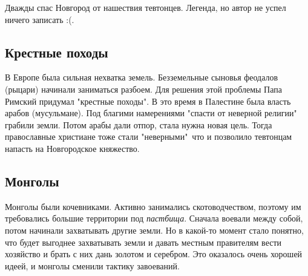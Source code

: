Дважды спас Новгород от нашествия тевтонцев. Легенда, но автор не успел ничего записать :(.

\subsection*{Крестные походы}

В Европе была сильная нехватка земель. Безземельные сыновья феодалов (рыцари) начинали заниматься разбоем. Для решения этой проблемы Папа Римский придумал "крестные походы". В это время в Палестине была власть арабов (мусульмане). Под благими намерениями "спасти от неверной религии"\, грабили земли. Потом арабы дали отпор, стала нужна новая цель. Тогда православные христиане тоже стали "неверными"\, что и позволило тевтонцам напасть на Новгородское княжество.

\subsection*{Монголы}

Монголы были кочевниками. Активно занимались скотоводчеством, поэтому им требовались большие территории под \textit{пастбища}. Сначала воевали между собой, потом начинали захватывать другие земли. Но в какой-то момент стало понятно, что будет выгоднее захватывать земли и давать местным правителям вести хозяйство и брать с них дань золотом и серебром. Это оказалось очень хорошей идеей, и монголы сменили тактику завоеваний.

